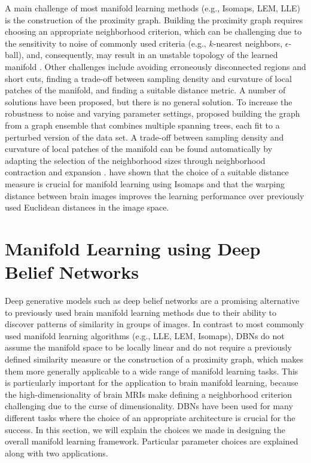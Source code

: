 A main challenge of most manifold learning methods (e.g., Isomaps, LEM, LLE) is
the construction of the proximity graph. Building the proximity graph requires
choosing an appropriate neighborhood criterion, which can be challenging due to
the sensitivity to noise of commonly used criteria (e.g., $k$-nearest neighbors,
$\epsilon$-ball), and, consequently, may result in an unstable topology of the
learned manifold \citep{balasubramanian2002}. Other challenges include avoiding
erroneously disconnected regions and short cuts, finding a trade-off between
sampling density and curvature of local patches of the manifold, and finding a
suitable distance metric. A number of solutions have been proposed, but there is
no general solution. To increase the robustness to noise and varying parameter
settings, \citet{carreira2005} proposed building the graph from a graph ensemble
that combines multiple spanning trees, each fit to a perturbed version of the
data set. A trade-off between sampling density and curvature of local patches of
the manifold can be found automatically by adapting the selection of the
neighborhood sizes through neighborhood contraction and expansion
\citep{zhang2012}. \citet{gerber2010} have shown that the choice of a suitable
distance measure is crucial for manifold learning using Isomaps and that the
warping distance between brain images improves the learning performance over
previously used Euclidean distances in the image space.

\section{Manifold Learning using Deep Belief Networks}

Deep generative models such as deep belief networks are a promising alternative
to previously used brain manifold learning methods due to their ability to
discover patterns of similarity in groups of images. In contrast to most
commonly used manifold learning algorithms (e.g., LLE, LEM, Isomaps), DBNs do
not assume the manifold space to be locally linear and do not require a
previously defined similarity measure or the construction of a proximity graph,
which makes them more generally applicable to a wide range of manifold learning
tasks. This is particularly important for the application to brain manifold
learning, because the high-dimensionality of brain MRIs make defining a
neighborhood criterion challenging due to the curse of dimensionality. DBNs have
been used for many different tasks where the choice of an appropriate
architecture is crucial for the success. In this section, we will explain the
choices we made in designing the overall manifold learning framework. Particular
parameter choices are explained along with two applications.


